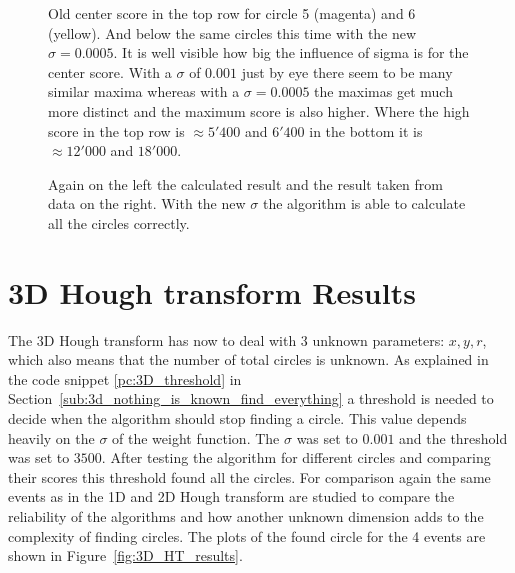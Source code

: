 \documentclass[11pt]{scrreprt}
\begin{document}
\begin{figure}
\centering
 
  \caption[2D HT: Comparison center scores 6 circles, 200 background hits]{Old center score in the top row for circle 5 (magenta) and 6 (yellow). And below the same circles this time with the new $\sigma=0.0005$. It is well visible how big the influence of sigma is for the center score. With a $\sigma$ of $0.001$ just by eye there seem to be many similar maxima whereas with a $\sigma=0.0005$ the maximas get much more distinct and the maximum score is also higher. Where the high score in the top row is $\approx 5'400$ and $6'400$ in the bottom it is $\approx 12'000$ and $18'000$.}
\end{figure}


\begin{figure}
\centering
\caption[2D HT: Comparison result, 6 circles, 200 background hits]{Again on the left the calculated result and the result taken from data on the right. With the new $\sigma$ the algorithm is able to calculate all the circles correctly.}\label{2d_result_6c_200bg_corr}
\end{figure}


\section{3D Hough transform Results} %
\label{sec:3d_hough_transform_results}
The 3D Hough transform has now to deal with 3 unknown parameters: $x,y,r$, which also means that the number of total circles is
unknown. As explained in the code snippet \ref{pc:3D_threshold} in Section~\ref{sub:3d_nothing_is_known_find_everything} a threshold is needed to decide when the algorithm
should stop finding a circle. This value depends heavily on the $\sigma$ of the weight function. The $\sigma$ was set to $0.001$ and the threshold
was set to $3500$. After testing the algorithm for different circles and comparing their scores this threshold found all the circles.
For comparison again the same events as in the 1D and 2D Hough transform are studied to compare the reliability of the algorithms and how another
unknown dimension adds to the complexity of finding circles. The plots of the found circle for the 4 events are shown in 
Figure~\ref{fig:3D_HT_results}.
\end{document}
